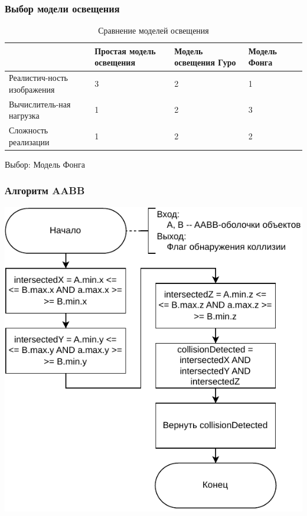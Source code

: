\documentclass{beamer}
\begin{document}
\begin{frame}
\frametitle{Выбор модели освещения}

\begin{table}[H]
    \caption{Сравнение моделей освещения}
    \label{tab:lighting-models}
\begin{adjustbox}{width=1\textwidth}
    \begin{tabular}{|p{}|p{}|p{}|p{}|p{}|}
        \hline
        &
        Простая модель освещения
        &
        Модель освещения Гуро
        &
        Модель Фонга
        \\
        \hline
        Реалистич-ность изображения
        &
        3 %
        &
        2 %
        &
        1 %
        \\
        \hline
        Вычислитель-ная нагрузка
        &
        1 %
        &
        2 %
        &
        3 %
        \\
        \hline
        Сложность реализации
        &
        1 %
        &
        2 %
        &
        2 %
        \\
        \hline
    \end{tabular}
\end{adjustbox}
\end{table}
Выбор: Модель Фонга
\end{frame}

\begin{frame}
\frametitle{Алгоритм AABB}
\centering
\includegraphics[scale=0.7]{diag/aabb_tighter.pdf}
\end{frame}
\end{document}
